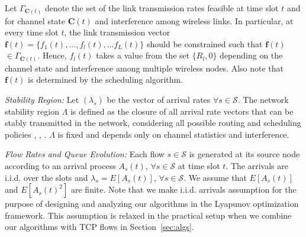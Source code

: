 \documentclass[conference]{IEEEtran}
\newcommand{\Sset}{\mathcal{S}}
\begin{document}
Let $\Gamma_{\boldsymbol C(t)}$ denote the set of the link transmission rates feasible at time slot $t$ and for channel state $\boldsymbol C(t)$ and interference among wireless links. In particular, at every time slot $t$, the link transmission vector $\boldsymbol f(t) = \{f_1(t), ..., f_l(t), ... f_L(t)\}$ should be constrained such that $\boldsymbol f(t)$ $\in \Gamma_{\boldsymbol C(t)}$. Hence, $f_l(t)$ takes a value from the set $\{R_l,0\}$ depending on the channel state and interference among multiple wireless nodes. Also note that $\boldsymbol f(t)$ is determined by the scheduling algorithm.


{\em Stability Region:}
Let $(\lambda_s)$ be the vector of arrival rates $\forall s \in \Sset$. The network stability region $\Lambda$ is defined as the closure of all arrival rate vectors that can be stably transmitted in the network, considering all possible routing and scheduling policies \cite{tass_eph1}, \cite{tass_eph2}, \cite{neely_mod}. $\Lambda$ is fixed and depends only on channel statistics and interference.



{\em Flow Rates and Queue Evolution:}  Each flow $s \in \Sset$ is generated at its source node according to an arrival process $A_s(t)$, $\forall s \in \Sset$ at time slot $t$. The arrivals are i.i.d. over the slots and $\lambda_s = E[A_s(t)]$, $\forall s \in \Sset$. We assume that $E[A_s(t)]$ and $E[A_s(t)^{2}]$ are finite. Note that we make i.i.d. arrivals assumption for the purpose of designing and analyzing our algorithms in the Lyapunov optimization framework. This assumption is relaxed in the practical setup when we combine our algorithms with TCP flows in Section~\ref{sec:algs}.
\end{document}

